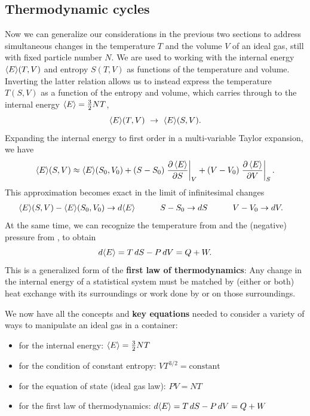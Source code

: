 \subsection{Thermodynamic cycles}
Now we can generalize our considerations in the previous two sections to address simultaneous changes in the temperature $T$ and the volume $V$ of an ideal gas, still with fixed particle number $N$.
We are used to working with the internal energy $\left\langle E \right\rangle\!(T, V)$ and entropy $S(T, V)$ as functions of the temperature and volume.
Inverting the latter relation allows us to instead express the temperature $T(S, V)$ as a function of the entropy and volume, which carries through to the internal energy $\left\langle E \right\rangle = \frac{3}{2}NT$,
\begin{equation*}
  \vev{E}\!(T, V) \ \to \ \vev{E}\!(S, V).
\end{equation*}
Expanding the internal energy to first order in a multi-variable Taylor expansion, we have
\begin{equation*}
  \left\langle E \right\rangle\!(S, V) \approx \left\langle E \right\rangle\!(S_0, V_0) + (S - S_0) \left.\frac{\partial \left\langle E \right\rangle}{\partial S}\right|_V + (V - V_0) \left.\frac{\partial \left\langle E \right\rangle}{\partial V}\right|_S.
\end{equation*}
This approximation becomes exact in the limit of infinitesimal changes
\begin{align*}
  \left\langle E \right\rangle\!(S, V) - \left\langle E \right\rangle\!(S_0, V_0) & \to d\!\left\langle E \right\rangle \qquad &
  S - S_0 & \to dS \qquad &
  V - V_0 & \to dV. &
\end{align*}
At the same time, we can recognize the temperature from  and the (negative) pressure from , to obtain
\begin{equation}
  \label{eq:first_law}
  d\!\left\langle E \right\rangle = T \, dS - P \, dV = Q + W.
\end{equation}
This is a generalized form of the \textbf{first law of thermodynamics}: Any change in the internal energy of a statistical system must be matched by (either or both) heat exchange with its surroundings or work done by or on those surroundings.

\begin{shaded}
  We now have all the concepts and \textbf{key equations} needed to consider a variety of ways to manipulate an ideal gas in a container: \\[-24 pt]
  \begin{itemize}
    \item {} for the internal energy: \hfill $\left\langle E \right\rangle = \frac{3}{2} NT$
    \item {} for the condition of constant entropy: \hfill $V T^{3/2} = \mbox{constant}$
    \item {} for the equation of state (ideal gas law): \hfill $PV = NT$
    \item {} for the first law of thermodynamics: \hfill $d\!\left\langle E \right\rangle = T \, dS - P \, dV = Q + W$
  \end{itemize}
\end{shaded}

